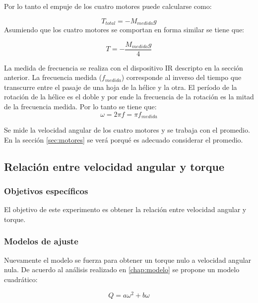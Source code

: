 \documentclass[main]{subfiles}
\begin{document}
Por lo tanto el empuje de los cuatro motores puede calcularse como:

\begin{equation}
T_{total}=-M_{medida}g
\end{equation}
Asumiendo que los cuatro motores se comportan en forma similar se tiene que:

\begin{equation}
T=-\frac{M_{medida}g}{4}
\end{equation}

La medida de frecuencia se realiza con el dispositivo IR descripto en la secci\'on anterior. La frecuencia medida ($f_{medida}$) corresponde al inverso del tiempo que transcurre entre el pasaje de una hoja de la h\'elice y la otra. El per\'iodo de la rotaci\'on de la h\'elice es el doble y por ende la frecuencia de la rotaci\'on es la mitad de la frecuencia medida. Por lo tanto se tiene que:
\begin{equation}
\label{eq:omega_ir}
\omega=2\pi f=\pi f_{medida}
\end{equation}

Se mide la velocidad angular de los cuatro motores y se trabaja con el promedio. En la secci\'on \ref{sec:motores} se ver\'a porqu\'e es adecuado considerar el promedio.

\subsection{Relaci\'on entre velocidad angular y torque}

\subsubsection*{Objetivos espec\'ificos}
El objetivo de este experimento es obtener la relaci\'on entre velocidad angular y torque.

\subsubsection*{Modelos de ajuste}
Nuevamente el modelo se fuerza para obtener un torque nulo a velocidad angular nula. De acuerdo al an\'alisis realizado en \ref{chap:modelo} se propone un modelo cuadr\'atico:

$$Q=a\omega^2+b\omega$$
\end{document}
